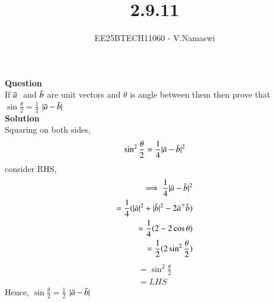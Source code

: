 \documentclass[journal]{IEEEtran}
\begin{document}

\vspace{3cm}

\title{2.9.11}
\author{EE25BTECH11060 - V.Namaswi}
{\let\newpage\relax\maketitle}
\renewcommand{\thefigure}{\theenumi}
\renewcommand{\thetable}{\theenumi}
\setlength{\intextsep}{10pt} %
\textbf{Question}\\If $\Bar{a} \;$ and \;$ \Bar{b} $ are unit vectors and $\theta$ is angle between them then prove that $\sin\frac{\theta}{2}=\frac{1}{2}$ $| {\Bar{a}-\Bar{b}}|$\\
\textbf{Solution}\\Squaring on both sides,\\
\begin{align*}
    \sin^2\frac{\theta}{2}=\frac{1}{4}| {\Bar{a}-\Bar{b}}|^2\\
    \end{align*}
  consider RHS,\\
\begin{align}
 \implies \frac{1}{4}| {\Bar{a}-\Bar{b}}|^2\\
  =\frac{1}{4}( |\Bar{a}|^2+|\Bar{b}|^2-2\Bar{a}^\top\Bar{b})\\
  =\frac{1}{4}(2-2\cos \theta)\\
  =\frac{1}{2}(2\sin^2{\frac{\theta}{2}})\\
  \end{align}
  \begin{align}
=\sin^2\frac{\theta}{2}\\
=LHS
\end{align}
Hence, $\sin\frac{\theta}{2}=\frac{1}{2}$  $| {\Bar{a}-\Bar{b}}|
$ 
\end{document}
